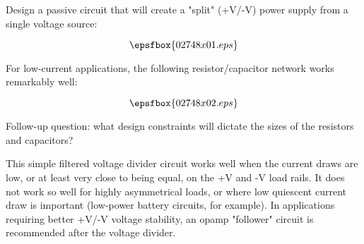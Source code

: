 

Design a passive circuit that will create a "split" (+V/-V) power supply from a single voltage source:

$$\epsfbox{02748x01.eps}$$







For low-current applications, the following resistor/capacitor network works remarkably well:

$$\epsfbox{02748x02.eps}$$

\vskip 10pt

Follow-up question: what design constraints will dictate the sizes of the resistors and capacitors?







This simple filtered voltage divider circuit works well when the current draws are low, or at least very close to being equal, on the +V and -V load rails.  It does not work so well for highly asymmetrical loads, or where low quiescent current draw is important (low-power battery circuits, for example).  In applications requiring better +V/-V voltage stability, an opamp "follower" circuit is recommended after the voltage divider.




